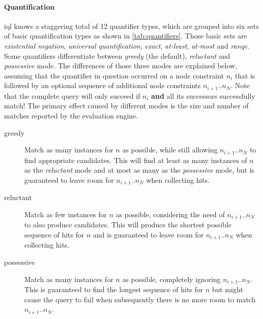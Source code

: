 \documentclass[11pt,a4paper]{article}
\begin{document}
\paragraph{Quantification}
\noindent \ac{iql} knows a staggering total of 12 quantifier types, which are grouped into six sets of basic quantification types as shown in \cref{tab:quantifiers}.
Those basic sets are \textit{existential negation}, \textit{universal quantification}, \textit{exact}, \textit{at-least}, \textit{at-most} and \textit{range}.
Some quantifiers differentiate between \textit{greedy} (the default), \textit{reluctant} and \textit{possessive} mode.
The differences of those three modes are explained below, assuming that the quantifier in question occurred on a node constraint $n_i$ that is followed by an optional sequence of additional node constraints $n_{i+1}..n_N$.
Note that the complete query will only succeed if $n_i$ \textbf{and} all its successors successfully match!
The primary effect caused by different modes is the size and number of matches reported by the evaluation engine.
\begin{description}
	\item[greedy] Match as many instances for $n$ as possible, while still allowing $n_{i+1}..n_N$ to find appropriate candidates. This will find at least as many instances of $n$ as the \textit{reluctant} mode and at most as many as the \textit{possessive} mode, but is guaranteed to leave room for $n_{i+1}..n_N$ when collecting hits.
	\item[reluctant] Match as few instances for $n$ as possible, considering the need of $n_{i+1}..n_N$ to also produce candidates. This will produce the shortest possible sequence of hits for $n$ and is guaranteed to leave room for $n_{i+1}..n_N$ when collecting hits.
	\item[possessive] Match as many instances for $n$ as possible, completely ignoring $n_{i+1}..n_N$. This is guaranteed to find the longest sequence of hits for $n$ but might cause the query to fail when subsequently there is no more room to match $n_{i+1}..n_N$.
\end{description}
\end{document}
